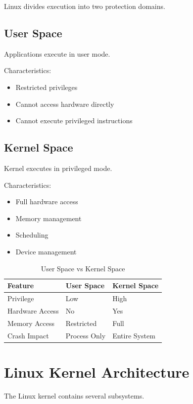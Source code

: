 Linux divides execution into two protection domains.

\subsection{User Space}

Applications execute in user mode.

Characteristics:

\begin{itemize}
\item Restricted privileges
\item Cannot access hardware directly
\item Cannot execute privileged instructions
\end{itemize}

\subsection{Kernel Space}

Kernel executes in privileged mode.

Characteristics:

\begin{itemize}
\item Full hardware access
\item Memory management
\item Scheduling
\item Device management
\end{itemize}

\begin{table}[H]
\centering
\begin{tabular}{lll}
\toprule
Feature & User Space & Kernel Space \\
\midrule
Privilege & Low & High \\
Hardware Access & No & Yes \\
Memory Access & Restricted & Full \\
Crash Impact & Process Only & Entire System \\
\bottomrule
\end{tabular}
\caption{User Space vs Kernel Space}
\end{table}

\section{Linux Kernel Architecture}

The Linux kernel contains several subsystems.

